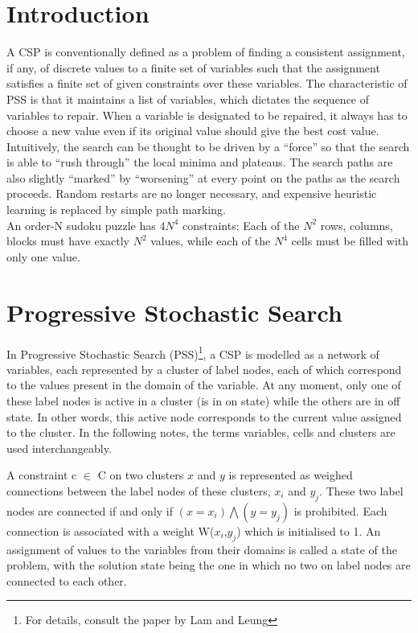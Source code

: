 \documentclass[a4paper]{article}
\begin{document}
\section{Introduction}
A CSP is conventionally defined as a problem of finding a consistent assignment, if any, of discrete values to a finite set of variables such that the assignment satisfies a finite set of given constraints over these variables. The characteristic of PSS is that it maintains a list of variables, which dictates the sequence of variables to repair. When a variable is designated to be repaired, it always has to choose a new value even if its original value should give the best cost value.\\
Intuitively, the search can be thought to be driven by a “force” so that the search is able to “rush through” the local minima and plateaus. The search paths are also slightly “marked” by “worsening” at every point on the paths as the search proceeds. Random restarts are no longer necessary, and expensive heuristic learning is replaced by simple path marking.\cite{mainref}\\

An order-N sudoku puzzle has $4N^4$ constraints: Each of the $N^2$ rows, columns, blocks must have exactly $N^2$ values, while each of the $N^4$ cells must be filled with only one value.\cite{suppref}

\section{Progressive Stochastic Search}
In Progressive Stochastic Search (PSS)\footnote{For details, consult the paper\cite{mainref} by Lam and Leung}, a CSP is modelled as a network of variables, each represented by a cluster of label nodes, each of which correspond to the values present in the domain of the variable. At any moment, only one of these label nodes is active in a cluster (is in on state) while the others are in off state. In other words, this active node corresponds to the current value assigned to the cluster. In the following notes, the terms variables, cells and clusters are used interchangeably.

A constraint c $\in$ C on two clusters $x$ and $y$ is represented as weighed connections between the label nodes of these clusters, $x_i$ and $y_j$. These two label nodes are connected if and only if $(x=x_i)\bigwedge(y=y_j)$ is prohibited. Each connection is associated with a weight W($x_i$,$y_j$) which is initialised to 1.
An assignment of values to the variables from their domains is called a state of the problem, with the solution state being the one in which no two on label nodes are connected to each other. \\
\end{document}
